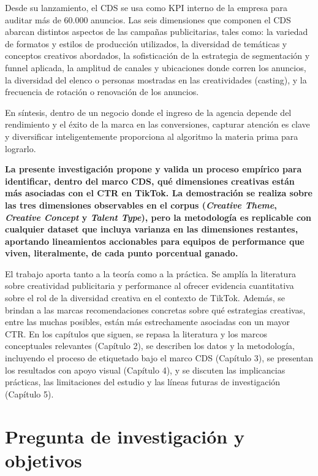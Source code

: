 \documentclass[12pt, a4paper]{report}
\begin{document}
Desde su lanzamiento, el CDS se usa como KPI interno de la empresa para auditar
más de 60.000 anuncios. Las seis dimensiones que componen el CDS abarcan
distintos aspectos de las campañas publicitarias, tales como: la variedad de
formatos y estilos de producción utilizados, la diversidad de temáticas y conceptos
creativos abordados, la sofisticación de la estrategia de segmentación y funnel
aplicada, la amplitud de canales y ubicaciones donde corren los anuncios, la
diversidad del elenco o personas mostradas en las creatividades (casting), y la
frecuencia de rotación o renovación de los anuncios.


En síntesis, dentro de un negocio donde el ingreso de la agencia depende del
rendimiento y el éxito de la marca en las conversiones, capturar atención es clave y
diversificar inteligentemente proporciona al algoritmo la materia prima para lograrlo.

\textbf{La presente investigación propone y valida un proceso empírico para identificar,
dentro del marco CDS, qué dimensiones creativas están más asociadas con el CTR en TikTok.
La demostración se realiza sobre las tres dimensiones observables en el corpus
(\textit{Creative Theme}, \textit{Creative Concept} y \textit{Talent Type}), pero la
metodología es replicable con cualquier dataset que incluya varianza en las dimensiones
restantes, aportando lineamientos accionables para equipos de performance que viven,
literalmente, de cada punto porcentual ganado.}

El trabajo aporta tanto a la teoría como a la práctica. Se amplía la literatura sobre
creatividad publicitaria y performance al ofrecer evidencia cuantitativa sobre el rol de
la diversidad creativa en el contexto de TikTok. Además, se brindan a las marcas
recomendaciones concretas sobre qué estrategias creativas, entre las muchas
posibles, están más estrechamente asociadas con un mayor CTR. En los capítulos que siguen, se repasa la literatura y los marcos conceptuales
relevantes (Capítulo 2), se describen los datos y la metodología, incluyendo el proceso
de etiquetado bajo el marco CDS (Capítulo 3), se presentan los resultados con apoyo
visual (Capítulo 4), y se discuten las implicancias prácticas, las limitaciones del estudio
y las líneas futuras de investigación (Capítulo 5).

\section{Pregunta de investigación y objetivos}
\end{document}

